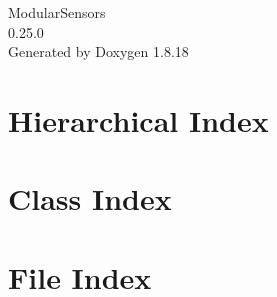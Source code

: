 \let\mypdfximage\pdfximage\def\pdfximage{\immediate\mypdfximage}\documentclass[twoside]{book}
\newcommand{\+}{\discretionary{\mbox{\scriptsize$\hookleftarrow$}}{}{}}
\newcommand{\clearemptydoublepage}{%
  \newpage{\pagestyle{empty}\cleardoublepage}%
}
\begin{document}
\hypersetup{pageanchor=false,
             bookmarksnumbered=true,
             pdfencoding=unicode
            }
\begin{titlepage}
\vspace*{7cm}
\begin{center}%
{\Large Modular\+Sensors \\[1ex]\large 0.\+25.\+0 }\\
\vspace*{1cm}
{\large Generated by Doxygen 1.8.18}\\
\end{center}
\end{titlepage}
\clearemptydoublepage
{}
\tableofcontents
\clearemptydoublepage
{}
\hypersetup{pageanchor=true}

\chapter{Hierarchical Index}

\chapter{Class Index}

\chapter{File Index}

\end{document}
